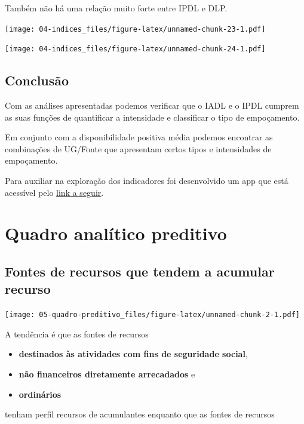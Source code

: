 \documentclass[
]{book}
\providecommand{\tightlist}{%
  \setlength{\itemsep}{0pt}\setlength{\parskip}{0pt}}
\begin{document}
Também não há uma relação muito forte entre IPDL e DLP.

\texttt{[image: 04-indices\_files/figure-latex/unnamed-chunk-23-1.pdf]}

\texttt{[image: 04-indices\_files/figure-latex/unnamed-chunk-24-1.pdf]}

\hypertarget{conclusuxe3o-1}{%
\section{Conclusão}\label{conclusuxe3o-1}}

Com as análises apresentadas podemos verificar que o IADL e o IPDL cumprem as suas funções de quantificar a intensidade e classificar o tipo de empoçamento.

Em conjunto com a disponibilidade positiva média podemos encontrar as combinações de UG/Fonte que apresentam certos tipos e intensidades de empoçamento.

Para auxiliar na exploração dos indicadores foi desenvolvido um app que está acessível pelo \href{https://rseis.shinyapps.io/explorador_indicador_empocamento/}{link a seguir}.

\hypertarget{quadro-analuxedtico-preditivo}{%
\chapter{Quadro analítico preditivo}\label{quadro-analuxedtico-preditivo}}

\hypertarget{fontes-de-recursos-que-tendem-a-acumular-recurso}{%
\section{Fontes de recursos que tendem a acumular recurso}\label{fontes-de-recursos-que-tendem-a-acumular-recurso}}

\texttt{[image: 05-quadro-preditivo\_files/figure-latex/unnamed-chunk-2-1.pdf]}

A tendência é que as fontes de recursos

\begin{itemize}
\tightlist
\item
  \textbf{destinados às atividades com fins de seguridade social},
\item
  \textbf{não financeiros diretamente arrecadados} e
\item
  \textbf{ordinários}
\end{itemize}

tenham perfil recursos de acumulantes enquanto que as fontes de recursos
\end{document}

